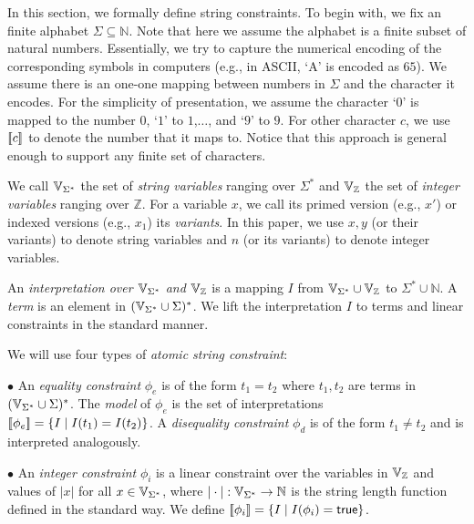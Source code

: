 \documentclass[sigplan,review,anonymous]{acmart}\settopmatter{printfolios=true,printccs=false,printacmref=false}
\begin{document}
In this section, we formally define string constraints. To begin with, we fix an finite alphabet $\Sigma \subseteq \mathbb{N}$. Note that here we assume the alphabet is a finite subset of natural numbers. Essentially, we try to capture the numerical encoding of the corresponding symbols in computers (e.g., in ASCII, `A' is encoded as $65$). We assume there is an one-one mapping between numbers in $\Sigma$ and the character it encodes. For the simplicity of presentation, we assume the character `$0$' is mapped to the number $0$, `$1$' to $1$,$\ldots$, and `$9$' to $9$. For other character $c$, we use $[\![c]\!]$ to denote the number that it maps to. Notice that this approach is general enough to support any finite set of characters. 


We call $\mbox{$\mathbb{V}_{\Sigma^*}$}$ the set of \emph{string variables} ranging over $\Sigma^*$ and $\mbox{$\mathbb{V}_{\mathbb{Z}}$}$ the set of \emph{integer variables} ranging over $\mathbb{Z}$.
For a variable $x$, we call its primed version (e.g., $x'$) or indexed versions (e.g., $x_1$) its \emph{variants}.
In this paper, we use $x,y$ (or their variants) to denote string variables and $n$ (or its variants) to denote integer variables.

An \emph{interpretation over $\mbox{$\mathbb{V}_{\Sigma^*}$}$ and $\mbox{$\mathbb{V}_{\mathbb{Z}}$}$} is a mapping $I$ from $\mbox{$\mathbb{V}_{\Sigma^*}$}\cup \mbox{$\mathbb{V}_{\mathbb{Z}}$}$ to $\Sigma^* \cup \mathbb{N}$. A \emph{term} is an element in $(\mbox{$\mathbb{V}_{\Sigma^*}$}\cup \Sigma)^*$. We lift the interpretation $I$ to terms and linear constraints in the standard manner. 

We will use four types of \emph{atomic string constraint}: 
\smallskip


$\bullet$ An \emph{equality constraint} $\phi_e$ is of the form $t_1 = t_2$ where $t_1, 
t_2$ are terms in $(\mbox{$\mathbb{V}_{\Sigma^*}$}\cup \Sigma)^*$. The \emph{model} of $\phi_e$ is the set of interpretations $[\![\phi_e]\!]=\{I\mid 
I(t_1)=I(t_2)\}$. A \emph{disequality constraint} $\phi_d$ is of the form $t_1 \neq 
t_2$ and is interpreted analogously.

\smallskip
$\bullet$ An \emph{integer constraint} $\phi_i$ is a linear constraint over the variables in $\mbox{$\mathbb{V}_{\mathbb{Z}}$}$ and values of $|x|$ for all $x \in \mbox{$\mathbb{V}_{\Sigma^*}$}$, where $|\cdot|:\mbox{$\mathbb{V}_{\Sigma^*}$} \rightarrow \mathbb{N}$ is the string length function defined in the standard way.
We define $[\![\phi_i]\!]= \{I \mid I(\phi_i)= \mbox{$\mathsf{true}$} \}$. 
\smallskip
\end{document}
